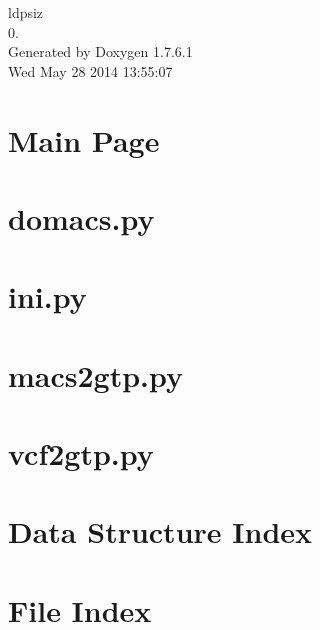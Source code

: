 \documentclass[letterpaper]{article}
\begin{document}
\hypersetup{pageanchor=false,citecolor=blue}
\begin{titlepage}
\vspace*{7cm}
\begin{center}
{\Large ldpsiz \\[1ex]\large 0. }\\
\vspace*{1cm}
{\large \-Generated by Doxygen 1.7.6.1}\\
\vspace*{0.5cm}
{\small Wed May 28 2014 13:55:07}\\
\end{center}
\end{titlepage}
\tableofcontents
{}
\hypersetup{pageanchor=true,citecolor=blue}
\section{\-Main \-Page}
\label{index}\hypertarget{index}{}
\section{domacs.\-py}
\label{domacs.py}
\hypertarget{domacs.py}{}

\section{ini.\-py}
\label{ini.py}
\hypertarget{ini.py}{}

\section{macs2gtp.\-py}
\label{macs2gtp.py}
\hypertarget{macs2gtp.py}{}

\section{vcf2gtp.\-py}
\label{vcf2gtp.py}
\hypertarget{vcf2gtp.py}{}

\section{\-Data \-Structure \-Index}

\section{\-File \-Index}

\end{document}
